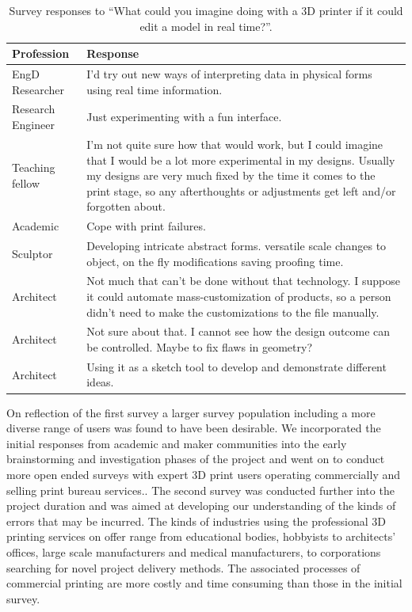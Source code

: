 \documentclass[11pt]{report} %
\begin{document}
\begin{table}[h]{\begin{minipage}{\textwidth}
\begin{tabular}{| p{2cm} | p{12cm} |}
\hline
\textbf{Profession} & \textbf{Response} \\\hline

EngD Researcher & I'd try out new ways of interpreting data in physical forms using real time information.\\\hline
Research Engineer & Just experimenting with a fun interface.\\\hline
Teaching fellow & I'm not quite sure how that would work, but I could imagine that I would be a lot more experimental in my designs. Usually my designs are very much fixed by the time it comes to the print stage, so any afterthoughts or adjustments get left and/or forgotten about.\\\hline
Academic & Cope with print failures.\\\hline
Sculptor & Developing intricate abstract forms. versatile scale changes to object, on the fly modifications saving proofing time.\\\hline
Architect & Not much that can't be done without that technology. I suppose it could automate mass-customization of products, so a person didn't need to make the customizations to the file manually.\\\hline
Architect & Not sure about that. I cannot see how the design outcome can be controlled. Maybe to fix flaws in geometry?\\\hline
Architect & Using it as a sketch tool to develop and demonstrate different ideas.\\\hline

\end{tabular}
\caption{Survey responses to ``What could you imagine doing with a 3D printer if it could edit a model in real time?''.}
\label{table:Surveys}
\end{minipage} }
\end{table}

On reflection of the first survey a larger survey population including a more diverse range of users was found to have been desirable. We incorporated the initial responses from academic and maker communities into the early brainstorming and investigation phases of the project and went on to conduct more open ended surveys with expert 3D print users operating commercially and selling print bureau services.. The second survey was conducted further into the project duration and was aimed at developing our understanding of the kinds of errors that may be incurred. The kinds of industries using the professional 3D printing services on offer range from educational bodies, hobbyists to architects' offices, large scale manufacturers and medical manufacturers, to corporations searching for novel project delivery methods. The associated processes of commercial printing are more costly and time consuming than those in the initial survey. 
\end{document}
